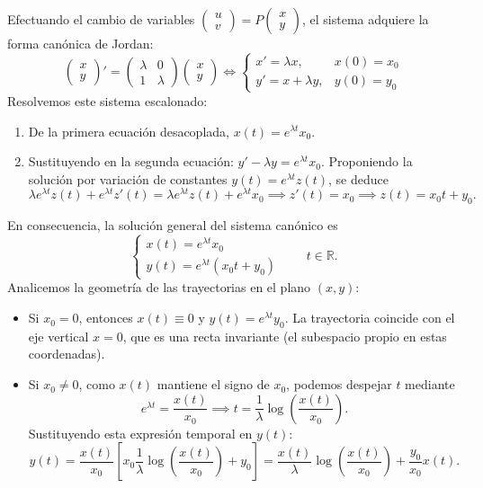 Efectuando el cambio de variables $\begin{pmatrix} u \\ v \end{pmatrix} = P \begin{pmatrix} x \\ y \end{pmatrix}$, el sistema adquiere la forma canónica de Jordan:
\[
    \begin{pmatrix} x \\ y \end{pmatrix}' = \begin{pmatrix} \lambda & 0 \\ 1 & \lambda \end{pmatrix} \begin{pmatrix} x \\ y \end{pmatrix}
    \iff
    \begin{cases}
        x' = \lambda x, & x(0) = x_0 \\
        y' = x + \lambda y, & y(0) = y_0
    \end{cases}
\]
Resolvemos este sistema escalonado:
\begin{enumerate}
    \item De la primera ecuación desacoplada, $x(t) = e^{\lambda t} x_0$.
    \item Sustituyendo en la segunda ecuación: $y' - \lambda y = e^{\lambda t} x_0$. Proponiendo la solución por variación de constantes $y(t) = e^{\lambda t} z(t)$, se deduce
    \[
        \lambda e^{\lambda t} z(t) + e^{\lambda t} z'(t) = \lambda e^{\lambda t} z(t) + e^{\lambda t} x_0 \implies z'(t) = x_0 \implies z(t) = x_0 t + y_0.
    \]
\end{enumerate}
En consecuencia, la solución general del sistema canónico es
\[
    \begin{cases}
        x(t) = e^{\lambda t} x_0 \\
        y(t) = e^{\lambda t} (x_0 t + y_0)
    \end{cases}
    \qquad t \in \mathbb{R}.
\]
Analicemos la geometría de las trayectorias en el plano $(x, y)$:
\begin{itemize}
    \item Si $x_0 = 0$, entonces $x(t) \equiv 0$ y $y(t) = e^{\lambda t} y_0$. La trayectoria coincide con el eje vertical $x = 0$, que es una recta invariante (el subespacio propio en estas coordenadas).
    \item Si $x_0 \neq 0$, como $x(t)$ mantiene el signo de $x_0$, podemos despejar $t$ mediante
    \[
        e^{\lambda t} = \frac{x(t)}{x_0} \implies t = \frac{1}{\lambda} \log \left( \frac{x(t)}{x_0} \right).
    \]
    Sustituyendo esta expresión temporal en $y(t)$:
    \[
        y(t) = \frac{x(t)}{x_0} \left[ x_0 \frac{1}{\lambda} \log \left( \frac{x(t)}{x_0} \right) + y_0 \right]
        = \frac{x(t)}{\lambda} \log \left( \frac{x(t)}{x_0} \right) + \frac{y_0}{x_0} x(t).
    \]
\end{itemize}
